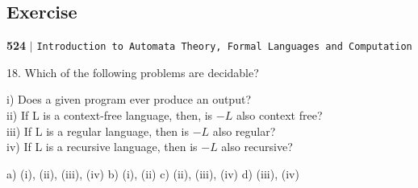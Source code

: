 \documentclass[8pt]{beamer}
\begin{document}
\begin{frame}
\section*{Exercise}
\begin{flushleft}
    \textbf{524}\hspace*{0.1cm} \textbf{$|$} \hspace*{0.1cm} \texttt{Introduction to Automata Theory, Formal Languages and Computation}
  \end{flushleft}
  \vspace*{0.5cm}
  
\hspace*{-0.4cm}
18. Which of the following problems are decidable?\\
\vspace*{0.1cm}

\hspace*{0.5cm} i) Does a given program ever produce an output?\\
\hspace*{0.5cm} ii) If L is a context-free language, then, is $-L$ also context free?\\
\hspace*{0.5cm} iii) If L is a regular language, then is $-L$ also regular?\\
\hspace*{0.5cm} iv) If L is a recursive language, then is $-L$ also recursive?\\
\vspace*{0.1cm}

\hspace*{0.5cm} a) (i), (ii), (iii), (iv)   \vspace*{0.1cm}  b) (i), (ii)  \vspace*{0.1cm} c) (ii), (iii), (iv)   \vspace*{0.1cm}  d) (iii), (iv)\\
\vspace*{0.3cm}


\end{frame}
\end{document}
